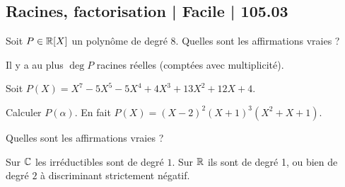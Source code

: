 \subsection{Racines, factorisation | Facile | 105.03}


\begin{question}
Soit $P \in \mathbb{R}[X]$ un polynôme de degré $8$.
Quelles sont les affirmations vraies ?
\begin{answers}



    
\end{answers}
\begin{explanations}
Il y a au plus $\deg P$ racines réelles (comptées avec multiplicité).
\end{explanations}
\end{question}


\begin{question}
Soit $P(X) = X^7 - 5 X^5 - 5 X^4 + 4 X^3 + 13 X^2 + 12 X + 4$.
\begin{answers}


    
    
\end{answers}
\begin{explanations}
Calculer $P(\alpha)$. En fait $P(X) = (X-2)^2(X+1)^3(X^2+X+1)$.
\end{explanations}
\end{question}



\begin{question}
Quelles sont les affirmations vraies ?
\begin{answers}



\end{answers}
\begin{explanations}
Sur $\mathbb{C}$ les irréductibles sont de degré $1$. Sur $\mathbb{R}$ ils sont de degré 1, ou bien de degré $2$ à discriminant strictement négatif.
\end{explanations}
\end{question}



